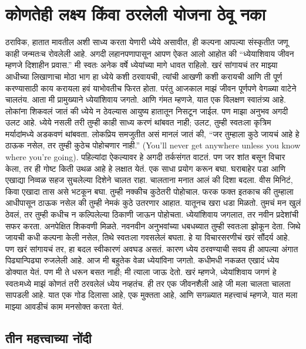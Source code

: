 \chapter{कोणतेही लक्ष्य किंवा ठरलेली योजना ठेवू नका}
ठराविक, हातात मावतील अशी साध्य करता येणारी ध्येये असावीत, ही कल्पना आपल्या संस्कृतीत जणू काही जन्मतःच रोवलेली आहे. अगदी लहानपणापासून आपण ऐकत आलो आहोत की “ध्येयाशिवाय जीवन म्हणजे दिशाहीन प्रवास.” मी स्वतः अनेक वर्षे ध्येयांच्या मागे धावत राहिलो. खरं सांगायचं तर माझ्या आधीच्या लिखाणाचा मोठा भाग हा ध्येये कशी ठरवायची, त्यांची आखणी कशी करायची आणि ती पूर्ण करण्यासाठी काय करायला हवं याभोवतीच फिरत होता.
परंतु आजकाल माझं जीवन पूर्णपणे वेगळ्या वाटेने चालतंय. आता मी प्रामुख्याने ध्येयांशिवाय जगतो. आणि गंमत म्हणजे, यात एक विलक्षण स्वातंत्र्य आहे. लोकांना शिकवलं जातं की ध्येये न ठेवल्यास आयुष्य हातातून निसटून जाईल. पण माझा अनुभव अगदी उलट आहे. ध्येये नसली तरी तुम्ही काही साध्य करणं थांबवत नाही; उलट, तुम्ही स्वतःला कृत्रिम मर्यादांमध्ये अडकवणं थांबवता.
लोकप्रिय समजुतीत असं मानलं जातं की,  “जर तुम्हाला कुठे जायचं आहे हे ठाऊक नसेल, तर तुम्ही कुठेच पोहोचणार नाही.” (You’ll never get anywhere unless you know where you’re going). पहिल्यांदा ऐकल्यावर हे अगदी तर्कसंगत वाटतं. पण जर शांत बसून विचार केला, तर ही गोष्ट किती उथळ आहे हे लक्षात येतं. एक साधा प्रयोग करून बघा. घराबाहेर पडा आणि एखाद्या निव्वळ सहज सुचलेल्या दिशेने चालत राहा. चालताना मनात आलं की दिशा बदला. वीस मिनिटं, किवा एखादा तास असे भटकून बघा. तुम्ही नक्कीच कुठेतरी पोहोचाल. फरक फक्त इतकाच की तुम्हाला आधीपासून ठाऊक नसेल की तुम्ही नेमकं कुठे उतरणार आहात.
यातूनच खरा धडा मिळतो. तुमचं मन खुलं ठेवलं, तर तुम्ही कधीच न कल्पिलेल्या ठिकाणी जाऊन पोहोचता. ध्येयांशिवाय जगलात, तर नवीन प्रदेशांची सफर करता. अनपेक्षित शिकवणी मिळते. नवनवीन अनुभवांच्या धबधब्यात तुम्ही स्वतःला झोकून देता. जिथे जायची कधी कल्पना केली नसेल, तिथे स्वतःला गवसलेलं बघता. हे या विचारसरणीचं खरं सौंदर्य आहे. पण खरं सांगायचं तर, हा बदल स्वीकारणं अवघड असतं. कारण ध्येय ठरवण्याची सवय ही आपल्या अंगात पिढ्यान्पिढ्या रुजलेली आहे.
आज मी बहुतेक वेळा ध्येयांविना जगतो. कधीमधी नकळत एखादं ध्येय डोक्यात येतं. पण मी ते धरून बसत नाही; मी त्याला जाऊ देतो. खरं म्हणजे, ध्येयांशिवाय जगणं हे स्वतःमध्ये माझं कोणतं तरी ठरवलेलं ध्येय नव्हतंच. ही तर एक जीवनशैली आहे जी मला चालता चालता सापडली आहे. यात एक गोड दिलासा आहे, एक मुक्तता आहे, आणि सगळ्यात महत्त्वाचं म्हणजे,  यात मला माझ्या आवडीचं काम मनसोक्त करता येतं.

\section*{तीन महत्त्वाच्या नोंदी}


